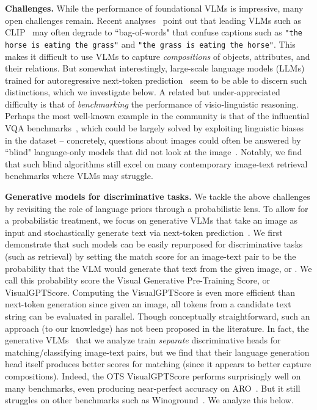 \documentclass{article} \usepackage{iclr2024_conference,times}
\begin{document}
{\bf Challenges.} While the performance of foundational VLMs is impressive, many open challenges remain. Recent analyses~\citep{kamath2023text, aro} point out that leading VLMs such as CLIP~\citep{clip} may often degrade to ``bag-of-words" that confuse captions such as {\tt "the horse is eating the grass"} and {\tt "the grass is eating the horse"}. This makes it difficult to use VLMs to capture {\em compositions} of objects, attributes, and their relations. But somewhat interestingly, large-scale language models (LLMs) trained for autoregressive next-token prediction~\citep{gpt3} seem to be able to discern such distinctions, which we investigate below. A related but under-appreciated difficulty is that of {\em benchmarking} the performance of visio-linguistic reasoning. 
Perhaps the most well-known example in the community is that of the influential VQA benchmarks~\citep{vqa}, which could be largely solved by exploiting linguistic biases in the dataset -- concretely, questions about images could often be answered by ``blind" language-only models that did not look at the image~\citep{vqa2}. Notably, we find that such blind algorithms still excel on many contemporary image-text retrieval benchmarks where VLMs may struggle.

{\bf Generative models for discriminative tasks.} We tackle the above challenges by revisiting the role of language priors through a probabilistic lens. To allow for a probabilistic treatment, we focus on generative VLMs that take an image as input and stochastically generate text via next-token prediction~\citep{blip, blip2}. We first demonstrate that such models can be easily repurposed for discriminative tasks (such as retrieval) by setting the match score for an image-text pair to be the probability that the VLM would generate that text from the given image, or . We call this probability score the Visual Generative Pre-Training Score, or VisualGPTScore. Computing the VisualGPTScore is even more efficient than next-token generation since given an image, all tokens from a candidate text string can be evaluated in parallel. Though conceptually straightforward, such an approach (to our knowledge) has not been proposed in the literature. In fact, the generative VLMs~\citep{blip} that we analyze train {\em separate} discriminative heads for matching/classifying image-text pairs, but we find that their language generation head itself produces better scores for matching (since it appears to better capture compositions). Indeed, the OTS VisualGPTScore performs surprisingly well on many benchmarks, even producing near-perfect accuracy on ARO~\citep{aro}. But it still struggles on other benchmarks such as Winoground~\citep{winoground}. We analyze this below. 
\end{document}
